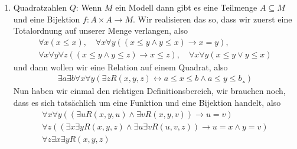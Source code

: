 \begin{solution}
\begin{enumerate}[label = \arabic*.]
		\item Quadratzahlen $Q$: Wenn $M$ ein Modell dann gibt es eine Teilmenge $A \subseteq M$ und eine Bijektion $f: A \times A \to M$. Wir realisieren das so, dass wir zuerst eine Totalordnung auf unserer Menge verlangen, also
		\begin{align*}
		\forall x (x \leq x), \quad \forall x \forall y ((x \leq y \land y \leq x) \rightarrow x = y),\\
		\forall x \forall y \forall z((x \leq y \land y \leq z) \rightarrow x \leq z), \quad \forall x \forall y (x \leq y \lor y \leq x)
		\end{align*}
		und dann wollen wir eine Relation auf einem Quadrat, also
		\begin{align*}
		\exists a \exists b \forall x \forall y(\exists zR(x,y,z) \leftrightarrow a \leq x \leq b \land a \leq y \leq b¸)
		\end{align*}
		Nun haben wir einmal den richtigen Definitionsbereich, wir brauchen noch, dass es sich tatsächlich um eine Funktion und eine Bijektion handelt, also
		\begin{align*}
		\forall x \forall y((\exists u R(x,y,u) \land \exists v R(x,y,v)) \rightarrow u = v) \\
		\forall z ((\exists x \exists y R(x,y,z) \land \exists u \exists v R(u,v,z)) \rightarrow u = x \land y = v) \\
		\forall z \exists x \exists y R(x,y,z)
		\end{align*}
	\end{enumerate}

\end{solution}
